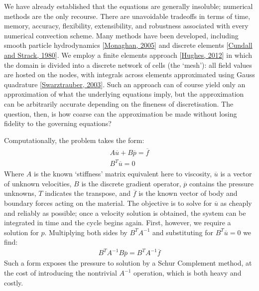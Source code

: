 \documentclass[letterpaper,10pt,english]{jupyterBook}
\begin{document}
\sphinxAtStartPar
We have already established that the equations are generally insoluble; numerical methods are the only recourse. There are unavoidable tradeoffs in terms of time, memory, accuracy, flexibility, extensibility, and robustness associated with every numerical convection scheme. Many methods have been developed, including smooth particle hydrodynamics {[}\hyperlink{cite.references:id688}{Monaghan, 2005}{]} and discrete elements {[}\hyperlink{cite.references:id689}{Cundall and Strack, 1980}{]}. We employ a finite elements approach {[}\hyperlink{cite.references:id678}{Hughes, 2012}{]} in which the domain is divided into a discrete network of cells (the ‘mesh’): all field values are hosted on the nodes, with integrals across elements approximated using Gauss quadrature {[}\hyperlink{cite.references:id686}{Swarztrauber, 2003}{]}. Such an approach can of course yield only an approximation of what the underlying equations imply, but the approximation can be arbitrarily accurate depending on the fineness of discretisation. The question, then, is how coarse can the approximation be made without losing fidelity to the governing equations?

\sphinxAtStartPar
Computationally, the problem takes the form:
\begin{equation*}
\begin{split} \begin{align*}
A \overline{u} + B \overline{p} = \overline{f} \\
B^T \overline{u} = 0
\end{align*} \end{split}
\end{equation*}
\sphinxAtStartPar
Where \(A\) is the known ‘stiffness’ matrix equivalent here to viscosity, \(\overline{u}\) is a vector of unknown velocities, \(B\) is the discrete gradient operator, \(\overline{p}\) contains the pressure unknowns, \(T\) indicates the transpose, and \(\overline{f}\) is the known vector of body and boundary forces acting on the material. The objective is to solve for \(\overline{u}\) as cheaply and reliably as possible; once a velocity solution is obtained, the system can be integrated in time and the cycle begins again. First, however, we require a solution for \(p\). Multiplying both sides by \(B^TA^{-1}\) and substituting for \(B^T\overline{u}=0\) we find:
\begin{equation*}
\begin{split} B^T A^{-1} B \overline{p} = B^T A^{-1} \overline{f} \end{split}
\end{equation*}
\sphinxAtStartPar
Such a form exposes the pressure to solution by a Schur Complement method, at the cost of introducing the non\sphinxhyphen{}trivial \(A^{-1}\) operation, which is both heavy and costly.
\end{document}

